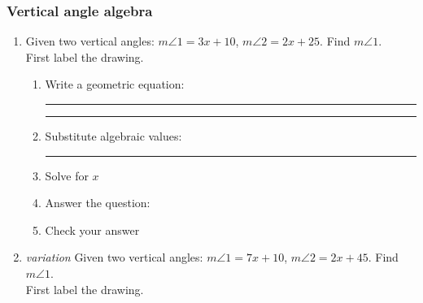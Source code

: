 \documentclass[12pt, twoside]{article}
\begin{document}
\subsubsection*{Vertical angle algebra}
  \begin{enumerate}
    \item Given two vertical angles: $m \angle 1 = 3x+10$, $m \angle 2 = 2x+25$. Find $m \angle 1$.\\
    First label the drawing.
    \begin{flushright}
    \end{flushright}
    \begin{enumerate}
      \item Write a geometric equation: \rule{4cm}{0.15mm} \hspace{1cm} \rule{4cm}{0.15mm}
      \item Substitute algebraic values: \rule{4cm}{0.15mm}
      \item Solve for $x$
      \item Answer the question:
      \item Check your answer
      \end{enumerate}

  \item \emph{variation} Given two vertical angles: $m \angle 1 = 7x+10$, $m \angle 2 = 2x+45$. Find $m \angle 1$.\\
    First label the drawing.
    \begin{flushright}
    \end{flushright}


\end{enumerate}
\end{document}
